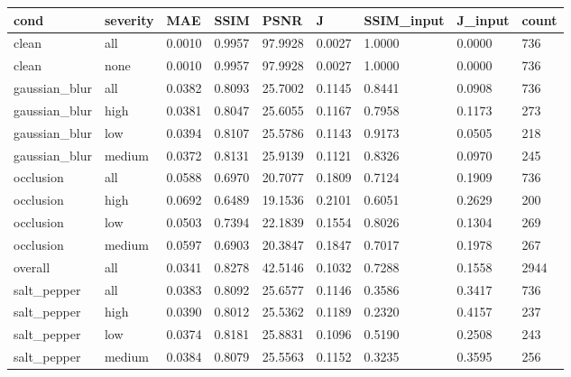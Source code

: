 \begin{tabular}{lllllllll}
\hline
cond & severity & MAE & SSIM & PSNR & J & SSIM\_input & J\_input & count \\
\hline
clean & all & 0.0010 & 0.9957 & 97.9928 & 0.0027 & 1.0000 & 0.0000 & 736 \\
clean & none & 0.0010 & 0.9957 & 97.9928 & 0.0027 & 1.0000 & 0.0000 & 736 \\
gaussian\_blur & all & 0.0382 & 0.8093 & 25.7002 & 0.1145 & 0.8441 & 0.0908 & 736 \\
gaussian\_blur & high & 0.0381 & 0.8047 & 25.6055 & 0.1167 & 0.7958 & 0.1173 & 273 \\
gaussian\_blur & low & 0.0394 & 0.8107 & 25.5786 & 0.1143 & 0.9173 & 0.0505 & 218 \\
gaussian\_blur & medium & 0.0372 & 0.8131 & 25.9139 & 0.1121 & 0.8326 & 0.0970 & 245 \\
occlusion & all & 0.0588 & 0.6970 & 20.7077 & 0.1809 & 0.7124 & 0.1909 & 736 \\
occlusion & high & 0.0692 & 0.6489 & 19.1536 & 0.2101 & 0.6051 & 0.2629 & 200 \\
occlusion & low & 0.0503 & 0.7394 & 22.1839 & 0.1554 & 0.8026 & 0.1304 & 269 \\
occlusion & medium & 0.0597 & 0.6903 & 20.3847 & 0.1847 & 0.7017 & 0.1978 & 267 \\
overall & all & 0.0341 & 0.8278 & 42.5146 & 0.1032 & 0.7288 & 0.1558 & 2944 \\
salt\_pepper & all & 0.0383 & 0.8092 & 25.6577 & 0.1146 & 0.3586 & 0.3417 & 736 \\
salt\_pepper & high & 0.0390 & 0.8012 & 25.5362 & 0.1189 & 0.2320 & 0.4157 & 237 \\
salt\_pepper & low & 0.0374 & 0.8181 & 25.8831 & 0.1096 & 0.5190 & 0.2508 & 243 \\
salt\_pepper & medium & 0.0384 & 0.8079 & 25.5563 & 0.1152 & 0.3235 & 0.3595 & 256 \\
\hline
\end{tabular}
